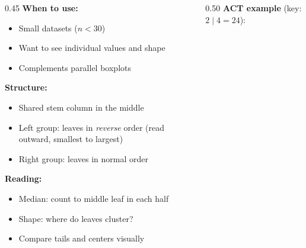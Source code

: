 \documentclass[aspectratio=169, 11pt]{beamer}
\begin{document}
{
\begin{frame}[t, plain]
  \vspace{0.45cm}\par
  \hspace{0.55cm}%
  \begin{minipage}{0.9\textwidth}
    \small
    \begin{columns}[T]
    \begin{column}{0.45\textwidth}
      \textbf{When to use:}
      \begin{itemize}\setlength{\itemsep}{0.3em}
        \item Small datasets ($n < 30$)
        \item Want to see individual values and shape
        \item Complements parallel boxplots
      \end{itemize}

      \vspace{0.4em}
      \textbf{Structure:}
      \begin{itemize}\setlength{\itemsep}{0.3em}
        \item Shared stem column in the middle
        \item Left group: leaves in \textit{reverse} order
              (read outward, smallest to largest)
        \item Right group: leaves in normal order
      \end{itemize}

      \vspace{0.4em}
      \textbf{Reading:}
      \begin{itemize}\setlength{\itemsep}{0.3em}
        \item Median: count to middle leaf in each half
        \item Shape: where do leaves cluster?
        \item Compare tails and centers visually
      \end{itemize}
    \end{column}
    \begin{column}{0.50\textwidth}
      \textbf{ACT example} (key: $2\mid4 = 24$):


\end{column}
\end{columns}
\end{minipage}
\end{frame}}
\end{document}
